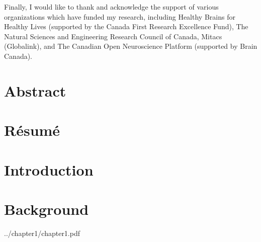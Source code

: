 \documentclass[fleqn,12pt]{SelfArx} %
\newcounter{secnonum}
\begin{document}
Finally, I would like to thank and acknowledge the support of various organizations which have funded my research,
including Healthy Brains for Healthy Lives (supported by the Canada First Research Excellence Fund), The Natural
Sciences and Engineering Research Council of Canada, Mitacs (Globalink), and The Canadian Open Neuroscience Platform
(supported by Brain Canada).
\clearpage

\section{Abstract}

\clearpage

\section{Résumé}

\clearpage

\tableofcontents %
\clearpage
\listoffigures
\clearpage
\listoftables
\clearpage


\section{Introduction}


\section{Background}



\onecolumn
\clearpage

{}

            {../chapter1/chapter1.pdf}
\clearpage
\end{document}
